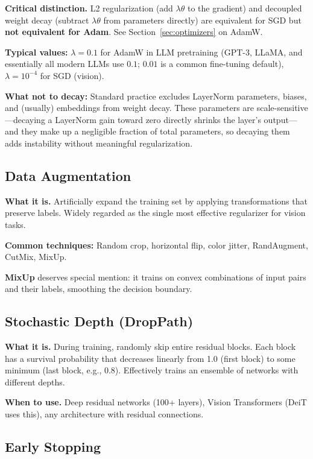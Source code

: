\textbf{Critical distinction.} L2 regularization (add $\lambda\theta$ to the gradient) and decoupled weight decay (subtract $\lambda\theta$ from parameters directly) are equivalent for SGD but \textbf{not equivalent for Adam}. See Section~\ref{sec:optimizers} on AdamW.

\textbf{Typical values:} $\lambda = 0.1$ for AdamW in LLM pretraining (GPT-3, LLaMA, and essentially all modern LLMs use $0.1$; $0.01$ is a common fine-tuning default), $\lambda = 10^{-4}$ for SGD (vision).

\textbf{What not to decay:} Standard practice excludes LayerNorm parameters, biases, and (usually) embeddings from weight decay. These parameters are scale-sensitive---decaying a LayerNorm gain toward zero directly shrinks the layer's output---and they make up a negligible fraction of total parameters, so decaying them adds instability without meaningful regularization.

\subsection{Data Augmentation}

\textbf{What it is.} Artificially expand the training set by applying transformations that preserve labels. Widely regarded as the single most effective regularizer for vision tasks.

\textbf{Common techniques:} Random crop, horizontal flip, color jitter, RandAugment, CutMix, MixUp.

\textbf{MixUp} deserves special mention: it trains on convex combinations of input pairs and their labels, smoothing the decision boundary.

\subsection{Stochastic Depth (DropPath)}

\textbf{What it is.} During training, randomly skip entire residual blocks. Each block has a survival probability that decreases linearly from 1.0 (first block) to some minimum (last block, e.g., 0.8). Effectively trains an ensemble of networks with different depths.

\textbf{When to use.} Deep residual networks (100+ layers), Vision Transformers (DeiT uses this), any architecture with residual connections.

\subsection{Early Stopping}

